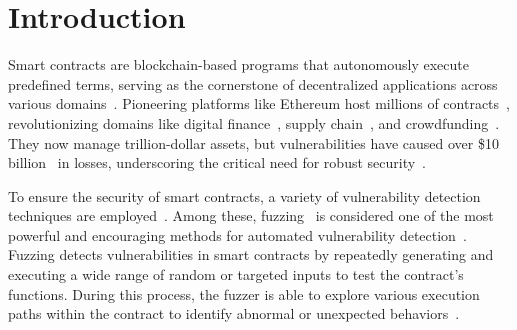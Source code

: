 \documentclass[sigconf]{acmart}
\newcommand{\ToolName}{\textcolor{ToolNameColor}{\textsf{{EchoFuzz}}}}
\begin{document}
\begin{sloppypar}
\begin{abstract}
To tackle these challenges, we propose \ToolName{}, an LLM-guided fuzzing framework introducing Vulnerable Function Call Sequences (VFCS) - minimal, behavior-preserving execution paths that expose bugs through key state transitions. \ToolName{} consists of two key procedures. First, we develop a chain-guided LLM approach, that combines static analysis with logical understanding to generate contract-specific VFCS candidates that eliminate combinatorial redundancy. Second, we adopt an iterative fuzzing strategy that uses LLMs with real-time feedback to adaptively steer fuzzer toward uncovered branches. Experiments show \ToolName{} outperforms state-of-the-art methods, achieving 29\% higher branch coverage and detecting 62\% more vulnerabilities. It also found 37 previously unknown vulnerabilities in real contracts, showing strong practicality.

\end{abstract}



%
\maketitle

% 
\section{Introduction}
%

%
Smart contracts are blockchain-based programs that autonomously execute predefined terms, serving as the cornerstone of decentralized applications across various domains~\cite{kosba2016hawk,chen2023tyr,ren2021making}. 
%
Pioneering platforms like Ethereum host millions of contracts~\cite{wood2014ethereum,ma2023pied,ma2021security}, revolutionizing domains like digital finance~\cite{antonopoulos2018mastering,dai2021trustzone}, supply chain~\cite{pawar2021secure,bains2022regulating}, and crowdfunding~\cite{jacynycz2016betfunding,zhang2024nyx}.
%
They now manage trillion-dollar assets, but vulnerabilities have caused over \$10 billion~\cite{pigni2018targeting,hasan2018proof,zheng2020overview} in losses, underscoring the critical need for robust security~\cite{newman2009computer}.


To ensure the security of smart contracts, a variety of vulnerability detection techniques are employed~\cite{amankwah2017evaluation,chakraborty2021deep}. Among these, fuzzing~\cite{li2018fuzzing} is considered one of the most powerful and encouraging methods for automated vulnerability detection~\cite{russell2018automated,li2016vulpecker}. 
Fuzzing detects vulnerabilities in smart contracts by repeatedly generating and executing a wide range of random or targeted inputs to test the contract's functions. During this process, the fuzzer is able to explore various execution paths within the contract to identify abnormal or unexpected behaviors~\cite{bonett2018discovering}.





\end{sloppypar}
\end{document}
